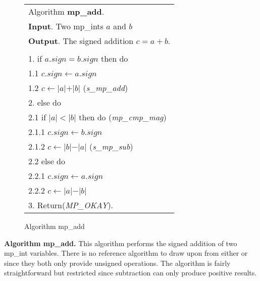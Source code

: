\documentclass[b5paper]{book}
\begin{document}
\begin{figure}[!here]
\begin{center}
\begin{tabular}{l}
\hline Algorithm \textbf{mp\_add}. \\
\textbf{Input}.   Two mp\_ints $a$ and $b$  \\
\textbf{Output}.  The signed addition $c = a + b$. \\
\hline \\
1.  if $a.sign = b.sign$ then do \\
\hspace{3mm}1.1  $c.sign \leftarrow a.sign$  \\
\hspace{3mm}1.2  $c \leftarrow \vert a \vert + \vert b \vert$ (\textit{s\_mp\_add})\\
2.  else do \\
\hspace{3mm}2.1  if $\vert a \vert < \vert b \vert$ then do (\textit{mp\_cmp\_mag})  \\
\hspace{6mm}2.1.1  $c.sign \leftarrow b.sign$ \\
\hspace{6mm}2.1.2  $c \leftarrow \vert b \vert - \vert a \vert$ (\textit{s\_mp\_sub}) \\
\hspace{3mm}2.2  else do \\
\hspace{6mm}2.2.1  $c.sign \leftarrow a.sign$ \\
\hspace{6mm}2.2.2  $c \leftarrow \vert a \vert - \vert b \vert$ \\
3.  Return(\textit{MP\_OKAY}). \\
\hline
\end{tabular}
\end{center}
\caption{Algorithm mp\_add}
\end{figure}

\textbf{Algorithm mp\_add.}
This algorithm performs the signed addition of two mp\_int variables.  There is no reference algorithm to draw upon from 
either \cite{TAOCPV2} or \cite{HAC} since they both only provide unsigned operations.  The algorithm is fairly 
straightforward but restricted since subtraction can only produce positive results.
\end{document}

